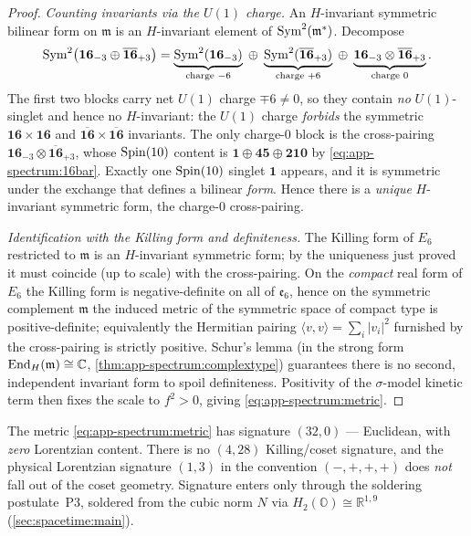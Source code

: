\begin{proof}
\emph{Counting invariants via the $U(1)$ charge.} An $H$-invariant
symmetric bilinear form on $\mathfrak m$ is an $H$-invariant element of
$\operatorname{Sym}^2(\mathfrak m^\ast)$. Decompose
\[
  \operatorname{Sym}^2\bigl(\mathbf{16}_{-3}\oplus\overline{\mathbf{16}}_{+3}\bigr)
   = \underbrace{\operatorname{Sym}^2(\mathbf{16}_{-3})}_{\text{charge }-6}
   \;\oplus\;
   \underbrace{\operatorname{Sym}^2(\overline{\mathbf{16}}_{+3})}_{\text{charge }+6}
   \;\oplus\;
   \underbrace{\mathbf{16}_{-3}\otimes\overline{\mathbf{16}}_{+3}}_{\text{charge }0}.
\]
The first two blocks carry net $U(1)$ charge $\mp6\neq0$, so they contain
\emph{no} $U(1)$-singlet and hence no $H$-invariant: the $U(1)$ charge
\emph{forbids} the symmetric $\mathbf{16}\times\mathbf{16}$ and
$\overline{\mathbf{16}}\times\overline{\mathbf{16}}$ invariants. The only
charge-$0$ block is the cross-pairing
$\mathbf{16}_{-3}\otimes\overline{\mathbf{16}}_{+3}$, whose $\operatorname{Spin}(10)$
content is $\mathbf 1\oplus\mathbf{45}\oplus\mathbf{210}$ by
\eqref{eq:app-spectrum:16bar}. Exactly one $\operatorname{Spin}(10)$ singlet $\mathbf 1$
appears, and it is symmetric under the exchange that defines a bilinear
\emph{form}. Hence there is a \emph{unique} $H$-invariant symmetric form,
the charge-$0$ cross-pairing.

\emph{Identification with the Killing form and definiteness.} The Killing
form of $E_6$ restricted to $\mathfrak m$ is an $H$-invariant symmetric
form; by the uniqueness just proved it must coincide (up to scale) with
the cross-pairing. On the \emph{compact} real form of $E_6$ the Killing
form is negative-definite on all of $\mathfrak e_6$, hence on the symmetric
complement $\mathfrak m$ the induced metric of the symmetric space of
compact type is positive-definite; equivalently the Hermitian pairing
$\langle v,v\rangle=\sum_i|v_i|^2$ furnished by the cross-pairing is
strictly positive. Schur's lemma (in the strong form
$\operatorname{End}_H(\mathfrak m)\cong\mathbb C$, \autoref{thm:app-spectrum:complextype})
guarantees there is no second, independent invariant form to spoil
definiteness. Positivity of the $\sigma$-model kinetic term then fixes the
scale to $f^2>0$, giving \eqref{eq:app-spectrum:metric}.
\end{proof}

\begin{remark}\label{rem:app-spectrum:nolorentz}
The metric \eqref{eq:app-spectrum:metric} has signature $(32,0)$ ---
Euclidean, with \emph{zero} Lorentzian content. There is no $(4,28)$
Killing/coset signature, and the physical Lorentzian signature $(1,3)$ in
the convention $(-,+,+,+)$ does \emph{not} fall out of the coset geometry.
Signature enters only through the soldering postulate~P3, soldered from the
cubic norm $N$ via $H_2(\mathbb O)\cong\mathbb R^{1,9}$
(\autoref{sec:spacetime:main}).
\end{remark}


